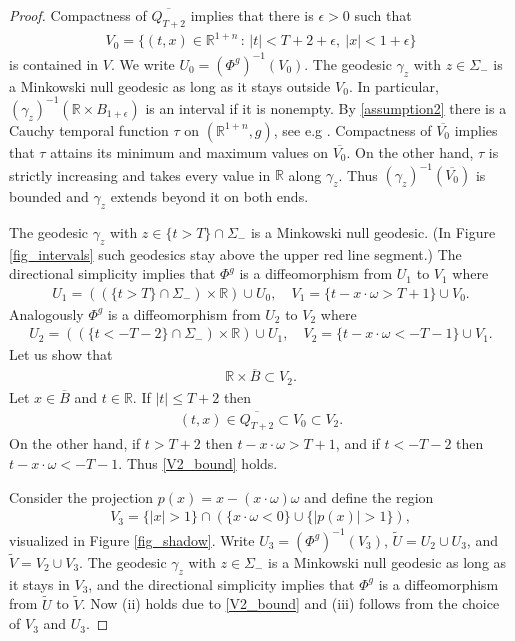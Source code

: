 \documentclass[11pt,letterpaper]{amsart}
\theoremstyle{definition}
\numberwithin{equation}{section}
\newcommand{\mR}{\mathbb{R}}                    %
\def\R{\mathbb R}
\def\mid{\,:\,}
\begin{document}
\begin{proof}
Compactness of $\overline{Q_{T+2}}$ implies that there is $\epsilon > 0$ such that
    \begin{align*}
V_0 = \{(t, x) \in \R^{1+n} \mid |t| < T+2 + \epsilon,\ |x| < 1 + \epsilon \}
    \end{align*}
is contained in $V$. We write $U_0 = (\Phi^g)^{-1}(V_0)$.
The geodesic $\gamma_z$ with $z \in \Sigma_-$ is a Minkowski null geodesic as long as it stays outside $V_0$. In particular, 
$(\gamma_z)^{-1}(\R \times B_{1+\epsilon})$ is an interval if it is nonempty. 
By \eqref{assumption2} there is a Cauchy temporal function $\tau$ on $(\mR^{1+n}, g)$, see e.g \cite[Proposition 2.3]{oksanen2024}. Compactness of $\overline{V_0}$ implies that $\tau$ attains its minimum and maximum values on $\overline{V_0}$. On the other hand, $\tau$ is strictly increasing and takes every value in $\R$ along $\gamma_z$. Thus 
$(\gamma_z)^{-1}(\overline{V_0})$ is bounded and $\gamma_z$ extends beyond it on both ends.

The geodesic $\gamma_z$ with $z \in \{t > T\} \cap \Sigma_-$ is a Minkowski null geodesic. (In Figure \ref{fig_intervals} such geodesics stay above the upper red line segment.) The directional simplicity implies that $\Phi^g$ is a diffeomorphism from $U_1$ to $V_1$ where
    \begin{align*}
U_1 = ((\{t > T\} \cap \Sigma_-) \times \R) \cup U_0,
\quad
V_1 = \{t - x \cdot \omega> T + 1\} \cup V_0.
    \end{align*}
Analogously $\Phi^g$ is a diffeomorphism from $U_2$ to $V_2$ where
    \begin{align*}
U_2 = ((\{t < -T - 2\} \cap \Sigma_-) \times \R) \cup U_1,
\quad
V_2 = \{t - x \cdot \omega < -T - 1\} \cup V_1.
    \end{align*}
Let us show that 
    \begin{align}\label{V2_bound}
\R \times \overline B \subset V_2.
    \end{align}
Let $x \in \overline B$ and $t \in \R$. If $|t| \le T + 2$ then 
    \begin{align*}
(t,x) \in \overline{Q_{T+2}} \subset V_0 \subset V_2.
    \end{align*}
On the other hand, if $t > T + 2$ then $t - x \cdot \omega > T + 1$, and if $t < -T - 2$ then $t - x \cdot \omega < -T - 1$. Thus \eqref{V2_bound} holds.

Consider the projection $p(x) = x - (x \cdot \omega) \omega$ and define the region
    \begin{align*}
V_3 = \{ |x| > 1 \} \cap (\{ x \cdot \omega < 0 \} \cup \{|p(x)| > 1\}),
    \end{align*}
visualized in Figure \ref{fig_shadow}. Write $U_3 = (\Phi^g)^{-1}(V_3)$, $\tilde U = U_2 \cup U_3$, and $\tilde V = V_2 \cup V_3$.
The geodesic $\gamma_z$ with $z \in \Sigma_-$ is a Minkowski null geodesic as long as it stays in $V_3$, and the directional simplicity implies that $\Phi^g$ is a diffeomorphism from $\tilde U$ to $\tilde V$. Now (ii) holds due to \eqref{V2_bound} and (iii) follows from the choice of $V_3$ and $U_3$. 


\end{proof}
\end{document}
